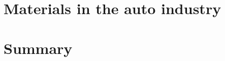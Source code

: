 \section{Materials in the auto industry}
\label{sec:materials_auto}

\section{Summary}
\label{sec:materials_summary}







%
%


